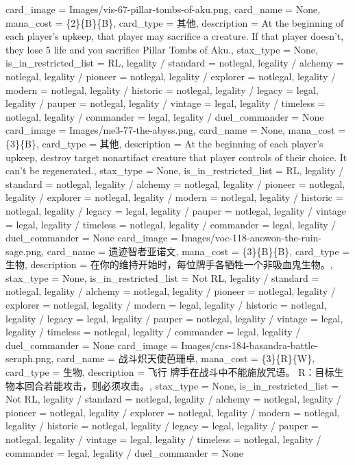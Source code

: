 \documentclass[lang = cn, color = black, 10pt]{AllThatStax}
\begin{document}
\card
{
	card_image = Images/vis-67-pillar-tombs-of-aku.png,
	card_name = None,
	mana_cost = \{2\}\{B\}\{B\},
	card_type = 其他,
	description = At the beginning of each player's upkeep, that player may sacrifice a creature. If that player doesn't, they lose 5 life and you sacrifice Pillar Tombs of Aku.,
	stax_type = None,
	is_in_restricted_list = RL,
	legality / standard = notlegal,
	legality / alchemy = notlegal,
	legality / pioneer = notlegal,
	legality / explorer = notlegal,
	legality / modern = notlegal,
	legality / historic = notlegal,
	legality / legacy = legal,
	legality / pauper = notlegal,
	legality / vintage = legal,
	legality / timeless = notlegal,
	legality / commander = legal,
	legality / duel_commander = None
}
\card
{
	card_image = Images/me3-77-the-abyss.png,
	card_name = None,
	mana_cost = \{3\}\{B\},
	card_type = 其他,
	description = At the beginning of each player's upkeep, destroy target nonartifact creature that player controls of their choice. It can't be regenerated.,
	stax_type = None,
	is_in_restricted_list = RL,
	legality / standard = notlegal,
	legality / alchemy = notlegal,
	legality / pioneer = notlegal,
	legality / explorer = notlegal,
	legality / modern = notlegal,
	legality / historic = notlegal,
	legality / legacy = legal,
	legality / pauper = notlegal,
	legality / vintage = legal,
	legality / timeless = notlegal,
	legality / commander = legal,
	legality / duel_commander = None
}
\card
{
	card_image = Images/voc-118-anowon-the-ruin-sage.png,
	card_name = 遗迹智者亚诺文,
	mana_cost = \{3\}\{B\}\{B\},
	card_type = 生物,
	description = 在你的维持开始时，每位牌手各牺牲一个非吸血鬼生物。,
	stax_type = None,
	is_in_restricted_list = Not RL,
	legality / standard = notlegal,
	legality / alchemy = notlegal,
	legality / pioneer = notlegal,
	legality / explorer = notlegal,
	legality / modern = legal,
	legality / historic = notlegal,
	legality / legacy = legal,
	legality / pauper = notlegal,
	legality / vintage = legal,
	legality / timeless = notlegal,
	legality / commander = legal,
	legality / duel_commander = None
}
\card
{
	card_image = Images/cns-184-basandra-battle-seraph.png,
	card_name = 战斗炽天使芭珊卓,
	mana_cost = \{3\}\{R\}\{W\},
	card_type = 生物,
	description = 飞行
	牌手在战斗中不能施放咒语。
	{R}：目标生物本回合若能攻击，则必须攻击。,
	stax_type = None,
	is_in_restricted_list = Not RL,
	legality / standard = notlegal,
	legality / alchemy = notlegal,
	legality / pioneer = notlegal,
	legality / explorer = notlegal,
	legality / modern = notlegal,
	legality / historic = notlegal,
	legality / legacy = legal,
	legality / pauper = notlegal,
	legality / vintage = legal,
	legality / timeless = notlegal,
	legality / commander = legal,
	legality / duel_commander = None
}
\end{document}
